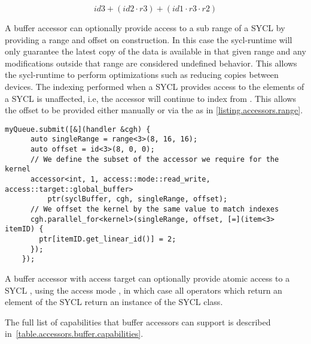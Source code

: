 \begin{equation}
\label{row-major-equation-buffer}
 id3 + (id2 \cdot r3) + (id1 \cdot r3 \cdot r2)
\end{equation}

A buffer accessor can optionally provide access to a sub range of a SYCL
 by providing a range and offset on construction. In this
case the \gls{sycl-runtime} will only guarantee the latest copy of the data is
available in that given range and any modifications outside that range are
considered undefined behavior. This allows the \gls{sycl-runtime} to perform
optimizations such as reducing copies between devices. The indexing performed
when a SYCL  provides access to the elements of a SYCL
 is unaffected, i.e, the accessor will continue to index
from . This allows the offset to be provided either
manually or via the  as in
\ref{listing.accessors.range}.

\begin{lstlisting}[label=listing.accessors.range]
    myQueue.submit([&](handler &cgh) {
      auto singleRange = range<3>(8, 16, 16);
      auto offset = id<3>(8, 0, 0);
      // We define the subset of the accessor we require for the kernel
      accessor<int, 1, access::mode::read_write, access::target::global_buffer>
          ptr(syclBuffer, cgh, singleRange, offset);
      // We offset the kernel by the same value to match indexes
      cgh.parallel_for<kernel>(singleRange, offset, [=](item<3> itemID) {
        ptr[itemID.get_linear_id()] = 2;
      });
    });
\end{lstlisting}

A buffer accessor with access target 
can optionally provide atomic access to a SYCL , using the
access mode , in which case all operators which
return an element of the SYCL  return an instance of the SYCL
 class.

The full list of capabilities that buffer accessors can support is described
in~\ref{table.accessors.buffer.capabilities}.

